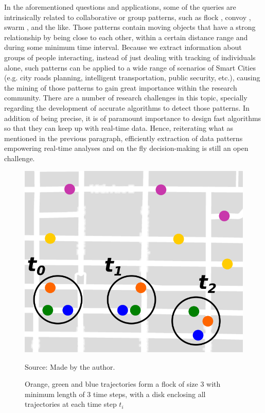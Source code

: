In the aforementioned questions and applications, some of the queries are intrinsically related to collaborative or
group patterns, such as flock \citep{gudefficient}, convoy \citep{convoy}, swarm \citep{swarm}, and the like. Those
patterns contain moving objects that have a strong relationship by being close to each other, within a certain distance
range and during some minimum time interval. Because we extract information about groups of people interacting, instead
of just dealing with tracking of individuals alone, such patterns can be applied to a wide range of scenarios of Smart
Cities (e.g. city roads planning, intelligent transportation, public security, etc.), causing the mining of those
patterns to gain great importance within the research community. There are a number of research challenges in this
topic, specially regarding the development of accurate algorithms to detect those patterns. In addition of being
precise, it is of paramount importance to design fast algorithms so that they can keep up with real-time data. Hence,
reiterating what as mentioned in the previous paragraph, efficiently extraction of data patterns empowering real-time
analyses and on the fly decision-making is still an open challenge.

\begin{figure}[h!]
    \centering
    \caption{Orange, green and blue trajectories form a flock of size 3 with minimum length of 3 time steps, with a disk
        enclosing all trajectories at each time step $t_i$}
    \centerline{\includegraphics[width=0.7\linewidth]{images/flock_pattern.png}}
    \footnotesize{Source: Made by the author.}
    \label{fig:flocks}
\end{figure}

